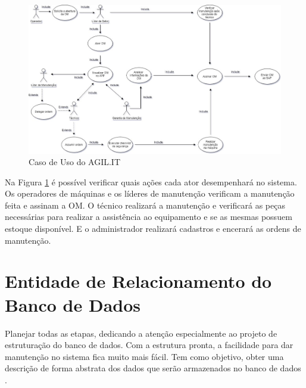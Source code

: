 {{\newpage
\begin{figure}[htb]
	\caption{\label{caso_uso}Caso de Uso do AGIL.IT}
	\begin{center}
		\includegraphics[scale=0.50]{./Figuras/caso-uso.png}
	\end{center}
\end{figure}

Na Figura \ref{caso_uso} é possível verificar quais ações cada ator desempenhará no sistema.
Os operadores de máquinas e os líderes de manutenção verificam a manutenção feita e assinam a OM. O técnico realizará a manutenção e verificará as peças necessárias para realizar a assistência ao equipamento e se as mesmas possuem estoque disponível. E o administrador realizará cadastros e encerará as ordens de manutenção.


\section{Entidade de Relacionamento do Banco de Dados}

{Planejar todas as etapas, dedicando a atenção especialmente ao projeto de estruturação do banco de dados. Com a estrutura pronta, a facilidade para dar manutenção no sistema fica muito mais fácil.
Tem como objetivo, obter uma descrição de forma abstrata dos dados que serão armazenados no banco de dados \cite{2010_erbd}. }


}}
